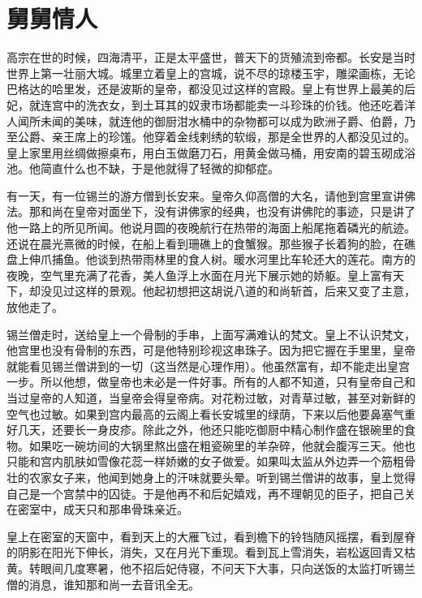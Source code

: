 \chapter{舅舅情人}

高宗在世的时候，四海清平，正是太平盛世，普天下的货殖流到帝都。长安是当时世界上第一壮丽大城。城里立着皇上的宫城，说不尽的琼楼玉宇，雕梁画栋，无论巴格达的哈里发，还是波斯的皇帝，都没见过这样的宫殿。皇上有世界上最美的后妃，就连宫中的洗衣女，到土耳其的奴隶市场都能卖一斗珍珠的价钱。他还吃着洋人闻所未闻的美味，就连他的御厨泔水桶中的杂物都可以成为欧洲子爵、伯爵，乃至公爵、亲王席上的珍馐。他穿着金线剌绣的软缎，那是全世界的人都没见过的。皇上家里用丝绸做擦桌布，用白玉做磨刀石，用黄金做马桶，用安南的碧玉砌成浴池。他简直什么也不缺，于是他就得了轻微的抑郁症。 

有一天，有一位锡兰的游方僧到长安来。皇帝久仰高僧的大名，请他到宫里宣讲佛法。那和尚在皇帝对面坐下，没有讲佛家的经典，也没有讲佛陀的事迹，只是讲了他一路上的所见所闻。他说月圆的夜晚航行在热带的海面上船尾拖着磷光的航迹。还说在晨光熹微的时候，在船上看到珊礁上的食蟹猴。那些猴子长着狗的脸，在礁盘上伸爪捕鱼。他谈到热带雨林里的食人树。暖水河里比车轮还大的莲花。南方的夜晚，空气里充满了花香，美人鱼浮上水面在月光下展示她的娇躯。皇上富有天下，却没见过这样的景观。他起初想把这胡说八道的和尚斩首，后来又变了主意，放他走了。 

锡兰僧走时，送给皇上一个骨制的手串，上面写满难认的梵文。皇上不认识梵文，他宫里也没有骨制的东西，可是他特别珍视这串珠子。因为把它握在手里里，皇帝就能看见锡兰僧讲到的一切（这当然是心理作用）。他虽然富有，却不能走出皇宫一步。所以他想，做皇帝也未必是一件好事。所有的人都不知道，只有皇帝自己和当过皇帝的人知道，当皇帝会得皇帝病。对花粉过敏，对青草过敏，甚至对新鲜的空气也过敏。如果到宫内最高的云阁上看长安城里的绿荫，下来以后他要鼻塞气重好几天，还要长一身皮疹。除此之外，他还只能吃御厨中精心制作盛在银碗里的食物。如果吃一碗坊间的大锅里熬出盛在粗瓷碗里的羊杂碎，他就会腹泻三天。他也只能和宫内肌肤如雪像花蕊一样娇嫩的女子做爱。如果叫太监从外边弄一个筋粗骨壮的农家女子来，他闻到她身上的汗味就要头晕。听到锡兰僧讲的故事，皇上觉得自己是一个宫禁中的囚徒。于是他再不和后妃嬉戏，再不理朝见的臣子，把自己关在密室中，成天只和那串骨珠亲近。 

皇上在密室的天窗中，看到天上的大雁飞过，看到檐下的铃铛随风摇摆，看到屋脊的阴影在阳光下伸长，消失，又在月光下重现。看到瓦上雪消失，岩松返回青又枯黄。转眼间几度寒暑，他不招后妃侍寝，不问天下大事，只向送饭的太监打听锡兰僧的消息，谁知那和尚一去音讯全无。 

